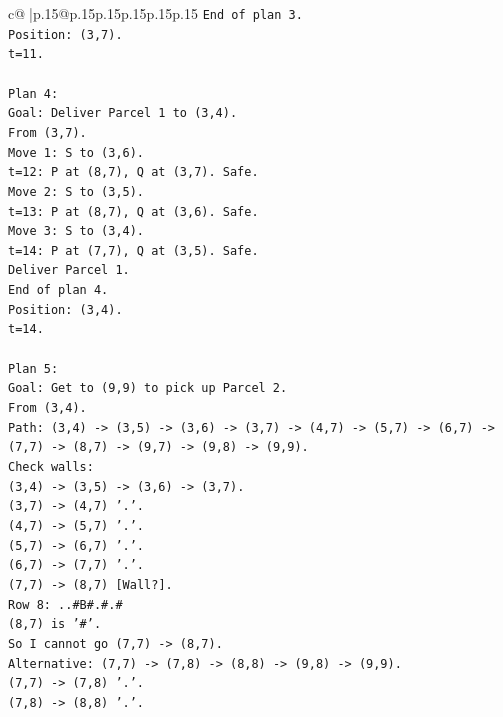 \documentclass{article}
\begin{document}
{\begin{supertabular}{c@{$\;$}|p{.15\linewidth}@{}p{.15\linewidth}p{.15\linewidth}p{.15\linewidth}p{.15\linewidth}p{.15\linewidth}}
{{{\texttt{End of plan 3.} \\
\texttt{Position: (3,7).} \\
\texttt{t=11.} \\
\\ 
\texttt{Plan 4:} \\
\texttt{Goal: Deliver Parcel 1 to (3,4).} \\
\texttt{From (3,7).} \\
\texttt{Move 1: S to (3,6).} \\
\texttt{t=12: P at (8,7), Q at (3,7). Safe.} \\
\texttt{Move 2: S to (3,5).} \\
\texttt{t=13: P at (8,7), Q at (3,6). Safe.} \\
\texttt{Move 3: S to (3,4).} \\
\texttt{t=14: P at (7,7), Q at (3,5). Safe.} \\
\texttt{Deliver Parcel 1.} \\
\texttt{End of plan 4.} \\
\texttt{Position: (3,4).} \\
\texttt{t=14.} \\
\\ 
\texttt{Plan 5:} \\
\texttt{Goal: Get to (9,9) to pick up Parcel 2.} \\
\texttt{From (3,4).} \\
\texttt{Path: (3,4) {-}> (3,5) {-}> (3,6) {-}> (3,7) {-}> (4,7) {-}> (5,7) {-}> (6,7) {-}> (7,7) {-}> (8,7) {-}> (9,7) {-}> (9,8) {-}> (9,9).} \\
\texttt{Check walls:} \\
\texttt{(3,4) {-}> (3,5) {-}> (3,6) {-}> (3,7).} \\
\texttt{(3,7) {-}> (4,7) '.'.} \\
\texttt{(4,7) {-}> (5,7) '.'.} \\
\texttt{(5,7) {-}> (6,7) '.'.} \\
\texttt{(6,7) {-}> (7,7) '.'.} \\
\texttt{(7,7) {-}> (8,7) {[}Wall?{]}.} \\
\texttt{Row 8: ..\#B\#.\#.\#} \\
\texttt{(8,7) is '\#'.} \\
\texttt{So I cannot go (7,7) {-}> (8,7).} \\
\texttt{Alternative: (7,7) {-}> (7,8) {-}> (8,8) {-}> (9,8) {-}> (9,9).} \\
\texttt{(7,7) {-}> (7,8) '.'.} \\
\texttt{(7,8) {-}> (8,8) '.'.} \\
}}}
\end{supertabular}}
\end{document}
